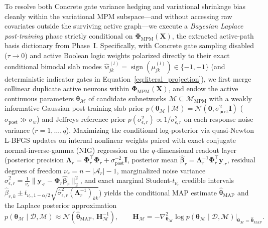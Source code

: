 \documentclass[11pt,a4paper]{article}
\begin{document}
To resolve both Concrete gate variance hedging and variational shrinkage bias cleanly within the variational MPM subspace---and without accessing raw covariates outside the surviving active graph---we execute a \emph{Bayesian Laplace post-training} phase strictly conditional on $\bm{\Phi}_{\text{MPM}}(\bm{X})$, the extracted active-path basis dictionary from Phase~I. Specifically, with Concrete gate sampling disabled ($\tau \to 0$) and active Boolean logic weights polarized directly to their exact conditional bimodal slab modes $\hat{w}_{jk}^{(l)} = \operatorname{sign}(\mu_{jk}^{(l)}) \in \{-1, +1\}$ (and deterministic indicator gates in Equation~\eqref{eq:literal_projection}), we first merge collinear duplicate active neurons within $\bm{\Phi}_{\text{MPM}}(\bm{X})$, and endow the active continuous parameters $\bm{\theta}_{\mathcal{M}}$ of candidate subnetworks $\mathcal{M} \subseteq \mathcal{M}_{\text{MPM}}$ with a weakly informative Gaussian post-training slab prior $p(\bm{\theta}_{\mathcal{M}} \mid \mathcal{M}) = \mathcal{N}(\bm{0}, \sigma_{\text{post}}^2 \bm{I})$ ($\sigma_{\text{post}} \gg \sigma_w$) and Jeffreys reference prior $p(\sigma_{\epsilon,r}^2) \propto 1/\sigma_{\epsilon,r}^2$ on each response noise variance ($r = 1, \dots, q$). Maximizing the conditional log-posterior via quasi-Newton L-BFGS updates on internal nonlinear weights paired with exact conjugate normal-inverse-gamma (NIG) regression on the $q$-dimensional readout layer (posterior precision $\bm{\Lambda}_r = \bm{\Phi}_r^\top \bm{\Phi}_r + \sigma_{\text{post}}^{-2}\bm{I}$, posterior mean $\hat{\bm{\beta}}_r = \bm{\Lambda}_r^{-1}\bm{\Phi}_r^\top \bm{y}_{\cdot r}$, residual degrees of freedom $\nu_r = n - |\mathcal{A}_r| - 1$, marginalized noise variance $\hat{\sigma}_{\epsilon,r}^2 = \frac{1}{\nu_r}\|\bm{y}_{\cdot r} - \bm{\Phi}_r\hat{\bm{\beta}}_r\|_2^2$, and exact marginal Student-$t_{\nu_r}$ credible intervals $\hat{\beta}_{r,k} \pm t_{\nu_r, 1-\alpha/2}\sqrt{\hat{\sigma}_{\epsilon,r}^2 (\bm{\Lambda}_r^{-1})_{kk}}$) yields the conditional MAP estimate $\hat{\bm{\theta}}_{\text{MAP}}$ and the Laplace posterior approximation
\begin{equation}
\label{eq:laplace_post}
p(\bm{\theta}_{\mathcal{M}} \mid \mathcal{D}, \mathcal{M}) \approx \mathcal{N}\!\left(\hat{\bm{\theta}}_{\text{MAP}},\, \bm{H}_{\mathcal{M}}^{-1}\right), \qquad \bm{H}_{\mathcal{M}} = -\nabla^2_{\bm{\theta}_{\mathcal{M}}} \log p(\bm{\theta}_{\mathcal{M}} \mid \mathcal{D}, \mathcal{M})\Big|_{\bm{\theta}_{\mathcal{M}} = \hat{\bm{\theta}}_{\text{MAP}}}.
\end{equation}
\end{document}
